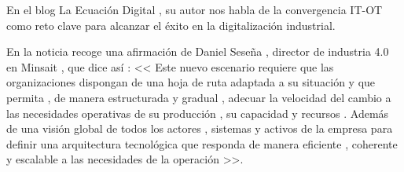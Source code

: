
%
%
%





En el blog La Ecuación Digital , su autor nos habla de la convergencia IT-OT como reto clave para 
alcanzar el éxito en la digitalización industrial.
\vspace{1em}

En la noticia recoge una afirmación de Daniel Seseña , director de industria 4.0 en Minsait , que dice así : 
<< Este nuevo escenario requiere que las organizaciones dispongan de una hoja 
de ruta adaptada a su situación y que permita , de manera estructurada y gradual , adecuar la velocidad del cambio a las necesidades operativas de su producción , 
su capacidad y recursos . Además de una visión global de todos los actores , sistemas y activos de la empresa para definir una arquitectura
tecnológica que responda de manera eficiente , coherente y escalable a las necesidades de la operación >>.
\vspace{1em}

